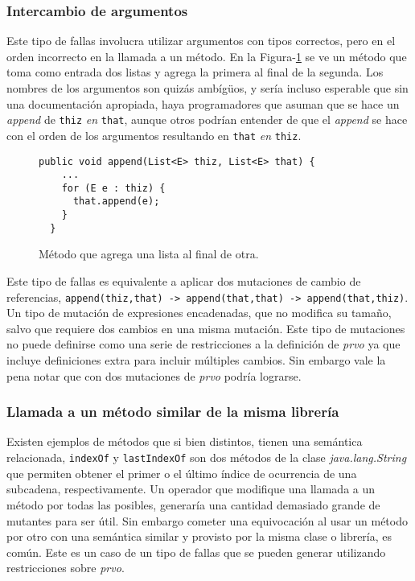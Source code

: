 \subsubsection{Intercambio de argumentos}

Este tipo de fallas involucra utilizar argumentos con tipos correctos, pero en el orden incorrecto en la llamada a un m\'etodo. En la Figura-\ref{figures.examples.argumentSwap.example1} se ve un m\'etodo que toma como entrada dos listas y agrega la primera al final de la segunda. Los nombres de los argumentos son quiz\'as amb\'ig\"{u}os, y ser\'ia incluso esperable que sin una documentaci\'on apropiada, haya programadores que asuman que se hace un \emph{append} de \texttt{thiz} \emph{en} \texttt{that}, aunque otros podr\'ian entender de que el \emph{append} se hace con el orden de los argumentos resultando en \texttt{that} \emph{en} \texttt{thiz}. 

\begin{figure}
	\begin{lstlisting}[frame=single, mathescape=true,framexleftmargin=1.5em]
  public void append(List<E> thiz, List<E> that) {
    ...
    for (E e : thiz) {
      that.append(e);
    }
  }
	\end{lstlisting}
	\caption{M\'etodo que agrega una lista al final de otra.}
	\label{figures.examples.argumentSwap.example1}
\end{figure}

Este tipo de fallas es equivalente a aplicar dos mutaciones de cambio de referencias, \lstinline|append(thiz,that) -> append(that,that) -> append(that,thiz)|. Un tipo de mutaci\'on de expresiones encadenadas, que no modifica su tama\~no, salvo que requiere dos cambios en una misma mutaci\'on. Este tipo de mutaciones no puede definirse como una serie de restricciones a la definici\'on de \emph{prvo} ya que incluye definiciones extra para incluir m\'ultiples cambios. Sin embargo vale la pena notar que con dos mutaciones de \emph{prvo} podr\'ia lograrse.

\subsubsection{Llamada a un m\'etodo similar de la misma librer\'ia}

Existen ejemplos de m\'etodos que si bien distintos, tienen una sem\'antica relacionada, \texttt{indexOf} y \texttt{lastIndexOf} son dos m\'etodos de la clase \emph{java.lang.String} que permiten obtener el primer o el \'ultimo \'indice de ocurrencia de una subcadena, respectivamente. Un operador que modifique una llamada a un m\'etodo por todas las posibles, generar\'ia una cantidad demasiado grande de mutantes para ser \'util. Sin embargo cometer una equivocaci\'on al usar un m\'etodo por otro con una sem\'antica similar y provisto por la misma clase o librer\'ia, es com\'un. Este es un caso de un tipo de fallas que se pueden generar utilizando restricciones sobre \emph{prvo}.

